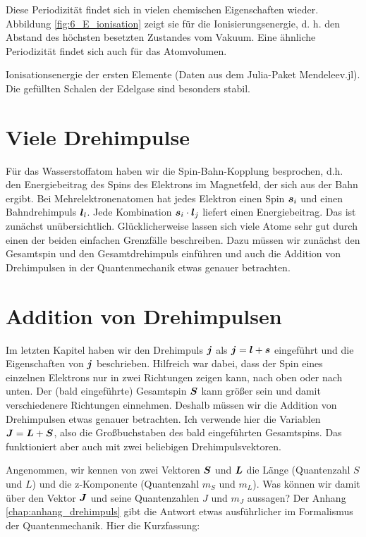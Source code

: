 Diese Periodizität findet sich in vielen chemischen Eigenschaften wieder. Abbildung \ref{fig:6_E_ionisation}
zeigt sie für die Ionisierungsenergie, d. h. den Abstand des höchsten besetzten Zustandes vom Vakuum. Eine ähnliche Periodizität findet sich auch für das Atomvolumen.

\begin{marginfigure}
    \caption{Ionisationsenergie der ersten Elemente (Daten aus dem Julia-Paket Mendeleev.jl). Die gefüllten Schalen der Edelgase sind besonders stabil.}
    \label{fig:6_E_ionisation}
\end{marginfigure}


\section{Viele Drehimpulse}


Für das Wasserstoffatom haben wir die Spin-Bahn-Kopplung besprochen, d.h. den Energiebeitrag des Spins des Elektrons im Magnetfeld, der sich aus der Bahn ergibt. Bei Mehrelektronenatomen hat jedes Elektron einen Spin $\boldsymbol{s}_i$ und einen Bahndrehimpuls $\boldsymbol{l}_l$. Jede Kombination $\boldsymbol{s}_i \cdot \boldsymbol{l}_j$ liefert einen Energiebeitrag. Das ist zunächst unübersichtlich. Glücklicherweise lassen sich viele Atome sehr gut durch einen der beiden einfachen Grenzfälle beschreiben. Dazu müssen wir zunächst den Gesamtspin und den Gesamtdrehimpuls einführen und auch die Addition von Drehimpulsen in der Quantenmechanik etwas genauer betrachten.


\section{Addition von Drehimpulsen}

Im letzten Kapitel haben wir den Drehimpuls $\boldsymbol{j}$ als $\boldsymbol{j} = \boldsymbol{l} + \boldsymbol{s}$ eingeführt und die Eigenschaften von $\boldsymbol{j}$ beschrieben. Hilfreich war dabei, dass der Spin eines einzelnen Elektrons nur in zwei Richtungen zeigen kann, nach oben oder nach unten. Der (bald eingeführte) Gesamtspin $\boldsymbol{S}$ kann größer sein und damit verschiedenere Richtungen einnehmen. Deshalb müssen wir die Addition von Drehimpulsen etwas genauer betrachten. Ich verwende hier die Variablen $\boldsymbol{J} = \boldsymbol{L} + \boldsymbol{S}$, also die Großbuchstaben des bald eingeführten Gesamtspins. Das funktioniert aber auch mit zwei beliebigen Drehimpulsvektoren.

Angenommen, wir kennen von zwei Vektoren $\boldsymbol{S}$ und $\boldsymbol{L}$ die Länge (Quantenzahl $S$ und $L$) und die z-Komponente (Quantenzahl $m_S$ und $m_L$). Was können wir damit über den Vektor $\boldsymbol{J}$ und seine Quantenzahlen $J$ und $m_J$ aussagen? Der Anhang \ref{chap:anhang_drehimpuls}
gibt die Antwort etwas ausführlicher im Formalismus der Quantenmechanik. Hier die Kurzfassung:

